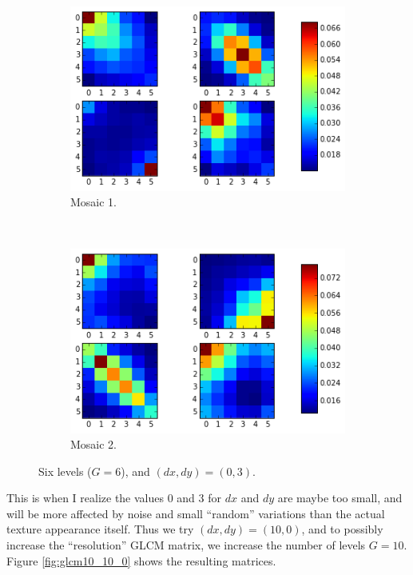 \documentclass[a4paper]{article}
\begin{document}
\begin{figure}
    \centering
    \begin{subfigure}[b]{0.40\textwidth}
        \centering
        \includegraphics[width=\textwidth]{m1_0_3.png}
        \caption{%
            Mosaic 1.
        }
    \end{subfigure}
    ~
    \begin{subfigure}[b]{0.40\textwidth}
        \centering
        \includegraphics[width=\textwidth]{m2_0_3.png}
        \caption{%
            Mosaic 2.
        }
    \end{subfigure}
    \caption{%
        Six levels ($G = 6$), and $(dx, dy) = (0, 3)$.
    }
    \label{fig:glcm6_0_3}
\end{figure}

This is when I realize the values 0 and 3 for $dx$ and $dy$ are maybe
too small, and will be more affected by noise and small ``random''
variations than the actual texture appearance itself. Thus we try $(dx,
dy) = (10, 0)$, and to possibly increase the ``resolution'' GLCM matrix,
we increase the number of levels $G = 10$. Figure \ref{fig:glcm10_10_0}
shows the resulting matrices.
\end{document}
